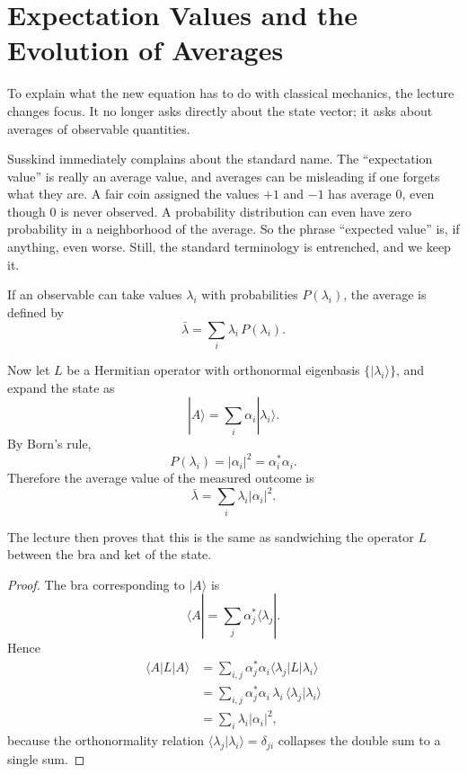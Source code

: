 \section{Expectation Values and the Evolution of Averages}

To explain what the new equation has to do with classical mechanics, the lecture changes focus. It no longer asks directly about the state vector; it asks about averages of observable quantities.

Susskind immediately complains about the standard name. The ``expectation value'' is really an average value, and averages can be misleading if one forgets what they are. A fair coin assigned the values \(+1\) and \(-1\) has average \(0\), even though \(0\) is never observed. A probability distribution can even have zero probability in a neighborhood of the average. So the phrase ``expected value'' is, if anything, even worse. Still, the standard terminology is entrenched, and we keep it.

If an observable can take values \(\lambda_i\) with probabilities \(P(\lambda_i)\), the average is defined by
\begin{equation}
\bar{\lambda}=\sum_i \lambda_i\,P(\lambda_i).
\end{equation}

Now let \(L\) be a Hermitian operator with orthonormal eigenbasis \(\{|\lambda_i\rangle\}\), and expand the state as
\begin{equation}
|A\rangle=\sum_i \alpha_i |\lambda_i\rangle.
\end{equation}
By Born's rule,
\begin{equation}
P(\lambda_i)=|\alpha_i|^2=\alpha_i^*\alpha_i.
\end{equation}
Therefore the average value of the measured outcome is
\begin{equation}
\bar{\lambda}=\sum_i \lambda_i |\alpha_i|^2.
\end{equation}

The lecture then proves that this is the same as sandwiching the operator \(L\) between the bra and ket of the state.

\begin{proof}
The bra corresponding to \(|A\rangle\) is
\begin{equation}
\langle A|=\sum_j \alpha_j^* \langle \lambda_j|.
\end{equation}
Hence
\begin{align}
\langle A|L|A\rangle
&=
\sum_{i,j}\alpha_j^*\alpha_i\langle \lambda_j|L|\lambda_i\rangle \\
&=
\sum_{i,j}\alpha_j^*\alpha_i\,\lambda_i\,\langle \lambda_j|\lambda_i\rangle \\
&=
\sum_i \lambda_i |\alpha_i|^2,
\end{align}
because the orthonormality relation \(\langle \lambda_j|\lambda_i\rangle=\delta_{ji}\) collapses the double sum to a single sum.
\end{proof}


